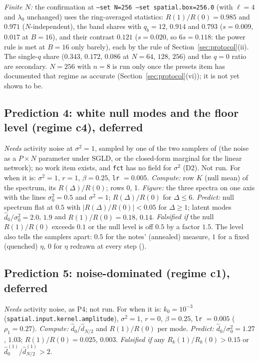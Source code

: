 \documentclass[11pt,a4paper]{article}
\newcommand{\code}[1]{\texttt{#1}}
\begin{document}
\emph{Finite $N$:} the confirmation at \code{--set N=256 --set spatial.box=256.0} (with $\ell = 4$ and $\lambda_0$ unchanged) uses the ring-averaged statistics: $R(1)/R(0) = 0.985$ and $0.971$ ($N$-independent), the band shares with $q_b = 12$, $0.914$ and $0.793$ ($s = 0.009$, $0.017$ at $B = 16$), and their contrast $0.121$ ($s = 0.020$, so $6s = 0.118$: the power rule is met at $B = 16$ only barely), each by the rule of Section~\ref{sec:protocol}(ii). The single-$q$ share ($0.343$, $0.172$, $0.086$ at $N = 64$, $128$, $256$) and the $q = 0$ ratio are secondary. $N = 256$ with $n = 8$ is run only once the presets item has documented that regime as accurate (Section~\ref{sec:protocol}(vi)); it is not yet shown to be.

\subsection{Prediction 4: white null modes and the floor level (regime c4), deferred}
\label{sec:P4}
\emph{Needs} activity noise at $\sigma^2 = 1$, sampled by one of the two samplers of  (the noise as a $P\times N$ parameter under SGLD, or the closed-form marginal for the linear network); no work item exists, and \code{fct} has no field for $\sigma^2$ (D2). Not run. For when it is: $\sigma^2 = 1$, $r = 1$, $\beta = 0.25$, \code{lr} $= 0.005$. \emph{Compute:} row $K$ (null mean) of the spectrum, its $R(\Delta)/R(0)$; rows 0, 1. \emph{Figure:} the three spectra on one axis with the lines $\sigma_0^2 = 0.5$ and $\sigma^2 = 1$; $R(\Delta)/R(0)$ for $\Delta\le6$. \emph{Predict:} null spectrum flat at $0.5$ with $|R(\Delta)/R(0)| < 0.05$ for $\Delta\ge1$; latent modes $\hat d_0/\sigma_0^2 = 2.0$, $1.9$ and $R(1)/R(0) = 0.18$, $0.14$. \emph{Falsified if} the null $R(1)/R(0)$ exceeds $0.1$ or the null level is off $0.5$ by a factor $1.5$. The level also tells the samplers apart: $0.5$ for the notes' (annealed) measure, $1$ for a fixed (quenched) $\eta$, $0$ for $\eta$ redrawn at every step ().

\subsection{Prediction 5: noise-dominated (regime c1), deferred}
\label{sec:P5}
\emph{Needs} activity noise, as P4; not run. For when it is: $k_0 = 10^{-3}$ (\code{spatial.input.kernel.amplitude}), $\sigma^2 = 1$, $r = 0$, $\beta = 0.25$, \code{lr} $= 0.005$ ($\rho_1 = 0.27$). \emph{Compute:} $\hat d_0/\hat d_{N/2}$ and $R(1)/R(0)$ per mode. \emph{Predict:} $\hat d_0/\sigma_0^2 = 1.27$, $1.03$; $R(1)/R(0) = 0.025$, $0.003$. \emph{Falsified if} any $R_k(1)/R_k(0) > 0.15$ or $\hat d_0^{(1)}/\hat d_{N/2}^{(1)} > 2$.
\end{document}
